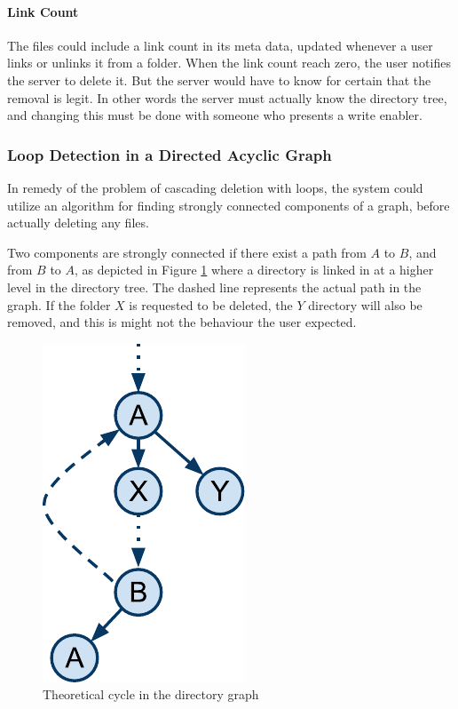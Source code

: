 \documentclass[pdftex,english,10pt,b5paper,twoside]{book}
\begin{document}
\paragraph{Link Count} The files could include a link count in its meta data,
updated whenever a user links or unlinks it from a folder. When the link count
reach zero, the user notifies the server to delete it. But the server would
have to know for certain that the removal is legit. In other words the server
must actually know the directory tree, and changing this must be done with
someone who presents a write enabler.

\subsubsection{Loop Detection in a Directed Acyclic Graph}

In remedy of the problem of cascading deletion with loops, the system could
utilize an algorithm for finding strongly connected components of a graph,
before actually deleting any files.

Two components are strongly connected if there exist a path from $A$ to $B$,
and from $B$ to $A$, as depicted in Figure \ref{fig:DSC:cycles} where a
directory is linked in at a higher level in the directory tree. The dashed line
represents the actual path in the graph. If the folder $X$ is requested to be
deleted, the $Y$ directory will also be removed, and this is might not the
behaviour the user expected.

\begin{figure}[h!]
    \centering
    \includegraphics[scale=0.6]{CyclesintheDAG.pdf}
    \caption{Theoretical cycle in the directory graph}
    \label{fig:DSC:cycles}
\end{figure}
\end{document}
